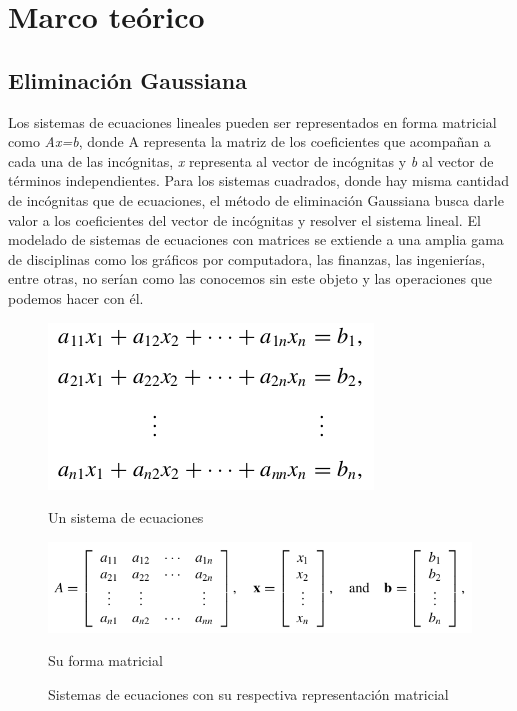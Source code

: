 \section{Marco teórico}

\subsection{Eliminación Gaussiana}

Los sistemas de ecuaciones lineales pueden ser representados en forma matricial como \textit{Ax=b}, donde A representa la matriz de los coeficientes que acompañan a cada una de las incógnitas, \textit{x} representa al vector de incógnitas y \textit{b} al vector de términos independientes. Para los sistemas cuadrados, donde hay misma cantidad de incógnitas que de ecuaciones, el método de eliminación Gaussiana busca darle valor a los coeficientes del vector de incógnitas y resolver el sistema lineal. El modelado de sistemas de ecuaciones con matrices se extiende a una amplia gama de disciplinas como los gráficos por computadora, las finanzas, las ingenierías, entre otras, no serían como las conocemos sin este objeto y las operaciones que podemos hacer con él. 

\begin{figure}[h]
    \centering
    \begin{minipage}{0.3\linewidth}
        \includegraphics[width=\linewidth]{img/sistema_de_ecuaciones.png}
        \caption{Un sistema de ecuaciones}
    \end{minipage}
  \begin{minipage}{0.45\linewidth}
      \includegraphics[width=\linewidth]{img/combinacion_lineal.png}
      \caption{Su forma matricial}
  \end{minipage}
  \caption{Sistemas de ecuaciones con su respectiva representación matricial}
\end{figure}

